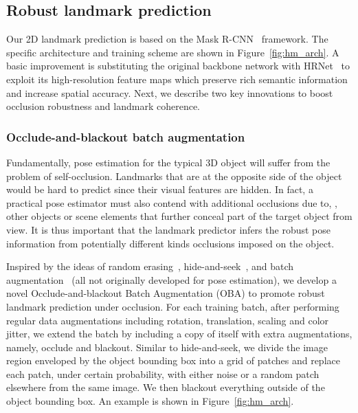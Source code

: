\documentclass[10pt,twocolumn,letterpaper]{article}
\begin{document}
\subsection{Robust landmark prediction}

Our 2D landmark prediction is based on the Mask R-CNN~\cite{He2018mask} framework. The specific architecture and training scheme are shown in Figure~\ref{fig:hm_arch}. A basic improvement is substituting the original backbone network with HRNet~\cite{Sun2019deep, Wang2020deep} to exploit its high-resolution feature maps which preserve rich semantic information and increase spatial accuracy. Next, we describe two key innovations to boost occlusion robustness and landmark coherence.

\subsubsection{Occlude-and-blackout batch augmentation}

Fundamentally, pose estimation for the typical 3D object will suffer from the problem of self-occlusion. Landmarks that are at the opposite side of the object would be hard to predict since their visual features are hidden. In fact, a practical pose estimator must also contend with additional occlusions due to, \eg, other objects or scene elements that further conceal part of the target object from view. It is thus important that the landmark predictor infers the robust pose information from potentially different kinds occlusions imposed on the object.



Inspired by the ideas of random erasing~\cite{Zhong2020random}, hide-and-seek~\cite{Singh2017hide}, and batch augmentation~\cite{Hoffer2020augment} (all not originally developed for pose estimation), we develop a novel Occlude-and-blackout Batch Augmentation (OBA) to promote robust landmark prediction under occlusion. For each training batch, after performing regular data augmentations including rotation, translation, scaling and color jitter, we extend the batch by including a copy of itself with extra augmentations, namely, occlude and blackout. Similar to hide-and-seek, we divide the image region enveloped by the object bounding box into a grid of patches and replace each patch, under certain probability, with either noise or a random patch elsewhere from the same image. We then blackout everything outside of the object bounding box. An example is shown in Figure~\ref{fig:hm_arch}. 
\end{document}
